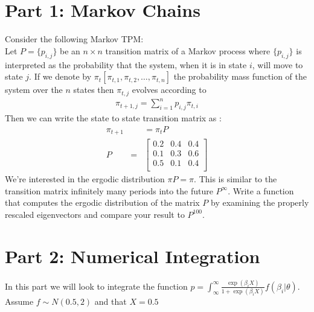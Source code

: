 \documentclass{article}
\begin{document}
\section*{Part 1: Markov Chains}
Consider the following Markov TPM:\\
Let $P = \{p_{i,j} \}$ be an $n \times n$ transition matrix of a Markov process where $\{p_{i,j} \}$ is interpreted as the probability that the system, when it is in state $i$, will move to state $j$. If we denote by $\pi_t [ \pi_{t,1} , \pi_{t,2}, \ldots, \pi_{t,n}]$ the probability mass function of the system over the $n$ states then $\pi_{t,j}$ evolves according to 
\begin{eqnarray*}
\pi_{t+1,j} = \sum_{i=1}^n p_{i,j} \pi_{t,i}
\end{eqnarray*}
Then we can write the state to state transition matrix as :
\begin{eqnarray*}
\pi_{t+1}& &= \pi_t P \\
P &=&
\left[ {\begin{array}{ccc}
    0.2&    0.4&    0.4\\
    0.1&    0.3&    0.6\\
    0.5&    0.1&    0.4\\
 \end{array} } \right]
\end{eqnarray*}
We're interested in the ergodic distribution $\pi P = \pi$. This is similar to the transition matrix infinitely many periods into the future $P^{\infty}$. Write a function that computes the ergodic distribution of the matrix $P$ by examining the properly rescaled eigenvectors and compare your result to $P^{100}$.
\section*{Part 2: Numerical Integration}
In this part we will look to integrate the function $p =\int_{\infty}^{\infty} \frac{\exp(\beta_i X)}{1+ \exp(\beta_i X)} f(\beta_i | \theta)$. \\
 Assume $f \sim N(0.5,2)$ and that $X = 0.5$
 
\end{document}
